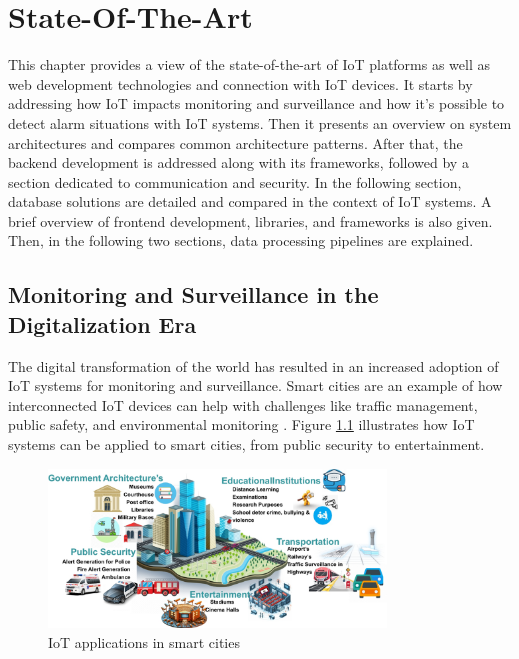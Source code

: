
%

\chapter{State-Of-The-Art}
\label{cha:State-Of-The-Art}

This chapter provides a view of the state-of-the-art of \gls{IoT} platforms
as well as web development technologies and connection with \gls{IoT} devices.
It starts by addressing how \gls{IoT} impacts monitoring and surveillance and how it's
possible to detect alarm situations with \gls{IoT} systems. Then it presents an overview on system architectures and compares common
architecture patterns. After that, the backend development is addressed along with
its frameworks, followed by a section dedicated to communication and security.
In the following section, database solutions are detailed and compared in the context of IoT
systems. A brief overview of frontend development, libraries, and frameworks is
also given.
Then, in the following two sections, data processing pipelines are explained.

\section{Monitoring and Surveillance in the Digitalization Era}
The digital transformation of the world has resulted in an increased adoption
of \gls{IoT} systems for monitoring and surveillance. Smart cities are an
example of how interconnected \gls{IoT} devices can help with challenges
like traffic management, public safety, and environmental monitoring \cite{sharma2024}. Figure
\ref{fig:monitoring:smartcities}
illustrates how \gls{IoT} systems can be applied to smart cities, from public
security to entertainment.

\begin{figure}[H]
	\centering
	\includegraphics[width=0.8\textwidth, height=0.5\textheight, keepaspectratio]{Chapters/Figures/Monitoring/SmartCities.png}
	\caption{IoT applications in smart cities\cite{sharma2024}}
	\label{fig:monitoring:smartcities}
\end{figure}

